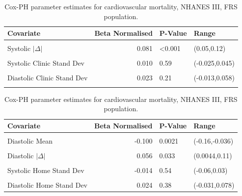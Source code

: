 \documentclass[
]{article}
\begin{document}
\begin{table}[!h]

\caption{\label{tab:freqCVDF}Cox-PH parameter estimates for cardiovascular mortality, NHANES III, FRS population.}
\centering
\begin{tabular}[t]{lrll}
\toprule
Covariate & Beta Normalised & P-Value & Range\\
\midrule
\cellcolor{gray!6}{FRS (1998)} & \cellcolor{gray!6}{0.202} & \cellcolor{gray!6}{<0.001} & \cellcolor{gray!6}{(0.13,0.28)}\\
Systolic $|\Delta|$ & 0.081 & <0.001 & (0.05,0.12)\\
\cellcolor{gray!6}{Diastolic $|\Delta|$} & \cellcolor{gray!6}{0.073} & \cellcolor{gray!6}{<0.001} & \cellcolor{gray!6}{(0.035,0.11)}\\
Systolic Clinic Stand Dev & 0.010 & 0.59 & (-0.025,0.045)\\
\cellcolor{gray!6}{Systolic Home Stand Dev} & \cellcolor{gray!6}{0.014} & \cellcolor{gray!6}{0.43} & \cellcolor{gray!6}{(-0.022,0.05)}\\
Diastolic Clinic Stand Dev & 0.023 & 0.21 & (-0.013,0.058)\\
\cellcolor{gray!6}{Diastolic Home Stand Dev} & \cellcolor{gray!6}{0.014} & \cellcolor{gray!6}{0.47} & \cellcolor{gray!6}{(-0.025,0.053)}\\
\bottomrule
\end{tabular}
\end{table}

\begin{table}[!h]

\caption{\label{tab:freqCVDF}Cox-PH parameter estimates for cardiovascular mortality, NHANES III, FRS population.}
\centering
\begin{tabular}[t]{lrll}
\toprule
Covariate & Beta Normalised & P-Value & Range\\
\midrule
\cellcolor{gray!6}{Systolic Mean} & \cellcolor{gray!6}{0.312} & \cellcolor{gray!6}{<0.001} & \cellcolor{gray!6}{(0.25,0.37)}\\
Diastolic Mean & -0.100 & 0.0021 & (-0.16,-0.036)\\
\cellcolor{gray!6}{Systolic $|\Delta|$} & \cellcolor{gray!6}{0.065} & \cellcolor{gray!6}{0.003} & \cellcolor{gray!6}{(0.021,0.11)}\\
Diastolic $|\Delta|$ & 0.056 & 0.033 & (0.0044,0.11)\\
\cellcolor{gray!6}{Systolic Clinic Stand Dev} & \cellcolor{gray!6}{-0.010} & \cellcolor{gray!6}{0.67} & \cellcolor{gray!6}{(-0.054,0.036)}\\
Systolic Home Stand Dev & -0.014 & 0.54 & (-0.06,0.03)\\
\cellcolor{gray!6}{Diastolic Clinic Stand Dev} & \cellcolor{gray!6}{-0.029} & \cellcolor{gray!6}{0.28} & \cellcolor{gray!6}{(-0.08,0.023)}\\
Diastolic Home Stand Dev & 0.024 & 0.38 & (-0.031,0.078)\\
\bottomrule
\end{tabular}
\end{table}
\end{document}
